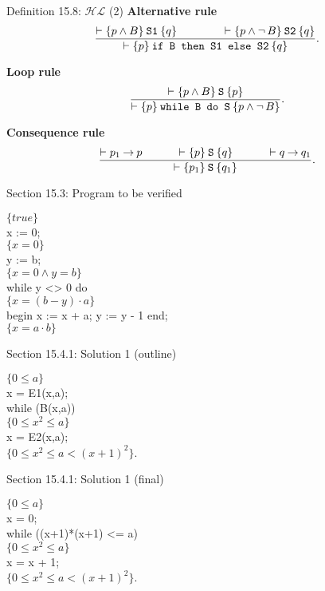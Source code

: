 \documentclass[style=simple,size=12pt]{powerdot}
\begin{document}
\begin{wideslide}[bm=,toc=]{Definition 15.8: $\mathcal{HL}$ (2)}
\noindent\textbf{Alternative rule}
\[\frac{\vdash\{p\wedge B\}\:{\textup{\texttt{S1}}}\:\{q\}\hspace{4em}
\vdash\{p\wedge\mathop{\neg} B\}\:{\textup{\texttt{S2}}}\:\{q\}}
{\vdash\{p\}\:{\textup{\texttt{if\ B\ then\ S1\ else\ S2}}}\:\{q\}}.\]

\noindent\textbf{Loop rule}
\[\frac{\vdash\{p\wedge B\}\:{\textup{\texttt{S}}}\:\{p\}}
{\vdash\{p\}\:{\textup{\texttt{while\ B\ do\ S}}}\:\{p\wedge \mathop{\neg} B\}}.\]

\noindent\textbf{Consequence rule}
\[\frac{\vdash p_{1}\imp p\hspace{3em}\vdash\induct{p}{S}{q}%
\hspace{3em}\vdash q\imp q_{1}}%
{\vdash\induct{p_{1}}{S}{q_{1}}}.\]
\end{wideslide}

\begin{wideslide}[bm=,toc=]{Section 15.3: Program to be verified}
\begin{program}
$\{\mathit{true}\}$\\
x := 0;\\
$\{x = 0\}$\\
y := b;\\
$\{x = 0 \wedge y = b\}$\\
while y <> 0 do\\
\>\>$\{x = (b-y)\cdot a\}$\\
\>\>begin x := x + a; y := y - 1 end;\\
$\{x = a\cdot b\}$
\end{program}
\end{wideslide}

\begin{wideslide}[bm=,toc=]{Section 15.4.1: Solution 1 (outline)}
\begin{program}
$\{0 \leq a\}$\\
x = E1(x,a);\\
while (B(x,a))\\
\>\>$\{0\leq x^{2}\leq a\}$\\
\>\>x = E2(x,a);\\
$\{0\leq x^{2}\leq a < (x+1)^{2}\}$.
\end{program}
\end{wideslide}

\begin{wideslide}[bm=,toc=]{Section 15.4.1: Solution 1 (final)}
\begin{program}
$\{0 \leq a\}$\\
x = 0;\\
while ((x+1)*(x+1) <= a)\\
\>\>$\{0\leq x^{2}\leq a\}$\\
\>\>x = x + 1;\\
$\{0\leq x^{2}\leq a < (x+1)^{2}\}.$
\end{program}
\end{wideslide}
\end{document}
